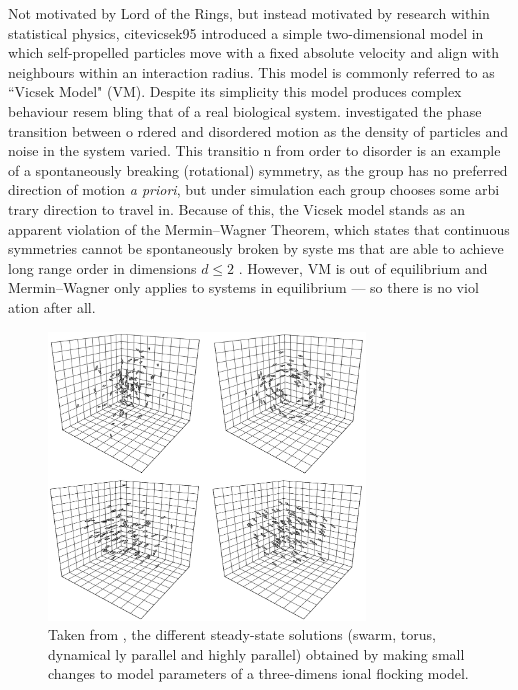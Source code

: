 Not motivated by Lord of the Rings, but instead motivated by research within statistical physics, \text
cite{vicsek95} introduced a simple two-dimensional model in which self-propelled particles move with a 
fixed absolute velocity and align with neighbours within an interaction radius. This model is commonly 
referred to as ``Vicsek Model" (VM). Despite its simplicity this model produces complex behaviour resem
bling that of a real biological system. \textcite{vicsek95} investigated the phase transition between o
rdered and disordered motion as the density of particles and noise in the system varied. This transitio
n from order to disorder is an example of a spontaneously breaking (rotational) symmetry, as the group 
has no preferred direction of motion \emph{a priori}, but under simulation each group chooses some arbi
trary direction to travel in. Because of this, the Vicsek model stands as an apparent violation of the 
Mermin--Wagner Theorem, which states that continuous symmetries cannot be spontaneously broken by syste
ms that are able to achieve long range order in dimensions $d\leq 2$ \parencite{mermin66}. However, VM 
is out of equilibrium and Mermin--Wagner only applies to systems in equilibrium --- so there is no viol
ation after all.

\begin{figure}[t]
	\includegraphics[width=0.75\textwidth]{couzin.png}
	\caption{Taken from \textcite{couzin02}, the different steady-state solutions (swarm, torus, dynamical
ly parallel and highly parallel) obtained by making small changes to model parameters of a three-dimens
ional flocking model.}
	\label{fig:couzin}
\end{figure}


